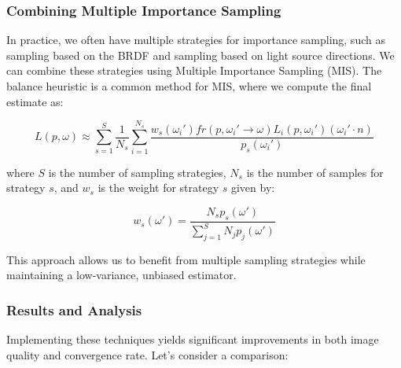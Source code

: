 \documentclass[12pt]{article}
\begin{document}
\subsubsection{Combining Multiple Importance Sampling}

In practice, we often have multiple strategies for importance sampling, such as sampling based on the BRDF and sampling based on light source directions. We can combine these strategies using Multiple Importance Sampling (MIS). The balance heuristic is a common method for MIS, where we compute the final estimate as:

\[
    L(p, \omega) \approx \sum_{s=1}^S \frac{1}{N_s} \sum_{i=1}^{N_s} \frac{w_s(\omega_i') fr(p, \omega_i' \to \omega) L_i(p, \omega_i') (\omega_i' \cdot n)}{p_s(\omega_i')}
\]

where \( S \) is the number of sampling strategies, \( N_s \) is the number of samples for strategy \( s \), and \( w_s \) is the weight for strategy \( s \) given by:

\[
    w_s(\omega') = \frac{N_s p_s(\omega')}{\sum_{j=1}^S N_j p_j(\omega')}
\]

This approach allows us to benefit from multiple sampling strategies while maintaining a low-variance, unbiased estimator.

\subsubsection{Results and Analysis}

Implementing these techniques yields significant improvements in both image quality and convergence rate. Let's consider a comparison:
\end{document}
